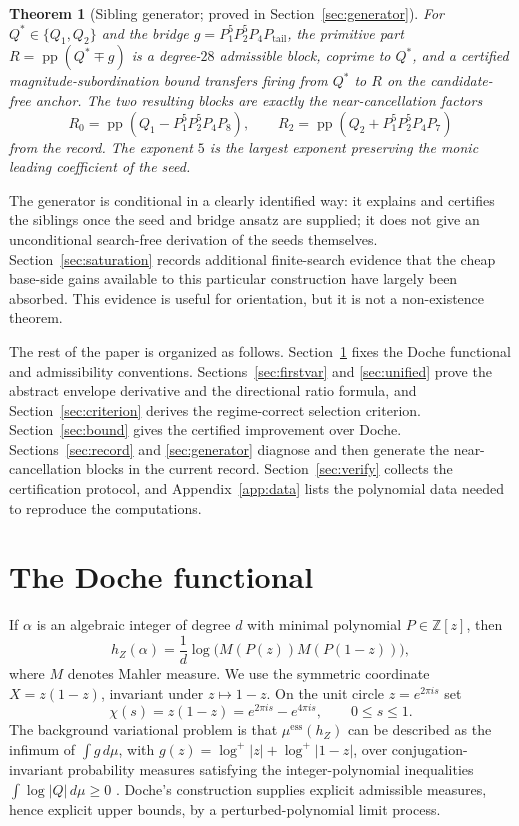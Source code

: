\documentclass[11pt,reqno]{amsart}
\theoremstyle{plain}
\newtheorem{theorem}{Theorem}
\theoremstyle{definition}
\theoremstyle{remark}
\newcommand{\Z}{\mathbb{Z}}
\newcommand{\hZ}{h_Z}
\newcommand{\essmin}{\mu^{\mathrm{ess}}(\hZ)}
\DeclareMathOperator{\pp}{pp}
\begin{document}
\begin{theorem}[Sibling generator; proved in Section~\ref{sec:generator}]
\label{thm:gen-intro}
For $Q^*\in\{Q_1,Q_2\}$ and the bridge $g=P_1^5P_2^5P_4P_{\mathrm{tail}}$, the
primitive part $R=\pp(Q^*\mp g)$ is a degree-$28$ admissible block, coprime to $Q^*$,
and a certified magnitude-subordination bound transfers firing from $Q^*$ to $R$ on
the candidate-free anchor.  The two resulting blocks are exactly the
near-cancellation factors
\[
  R_0=\pp(Q_1-P_1^5P_2^5P_4P_8),\qquad
  R_2=\pp(Q_2+P_1^5P_2^5P_4P_7)
\]
from the \citet{Gri26} record.  The exponent $5$ is the largest exponent preserving
the monic leading coefficient of the seed.
\end{theorem}

The generator is conditional in a clearly identified way: it explains and certifies the
siblings once the seed and bridge ansatz are supplied; it does not give an unconditional
search-free derivation of the seeds themselves.  Section~\ref{sec:saturation} records
additional finite-search evidence that the cheap base-side gains available to this
particular construction have largely been absorbed.  This evidence is useful for
orientation, but it is not a non-existence theorem.

The rest of the paper is organized as follows.  Section~\ref{sec:functional} fixes the
Doche functional and admissibility conventions.  Sections~\ref{sec:firstvar} and
\ref{sec:unified} prove the abstract envelope derivative and the directional ratio
formula, and Section~\ref{sec:criterion} derives the regime-correct selection
criterion.  Section~\ref{sec:bound} gives the certified improvement over Doche.
Sections~\ref{sec:record} and \ref{sec:generator} diagnose and then generate the
near-cancellation blocks in the current record.  Section~\ref{sec:verify} collects the
certification protocol, and Appendix~\ref{app:data} lists the polynomial data needed to
reproduce the computations.

\section{The Doche functional}\label{sec:functional}

If $\alpha$ is an algebraic integer of degree $d$ with minimal polynomial
$P\in\Z[z]$, then
\[
  \hZ(\alpha)=\frac1d\log\bigl(M(P(z))M(P(1-z))\bigr),
\]
where $M$ denotes Mahler measure.  We use the symmetric coordinate
$X=z(1-z)$, invariant under $z\mapsto1-z$.  On the unit circle $z=e^{2\pi i s}$ set
\[
  \chi(s)=z(1-z)=e^{2\pi i s}-e^{4\pi i s},\qquad 0\le s\le1.
\]
The background variational problem is that $\essmin$ can be described as the infimum
of $\int g\,d\mu$, with $g(z)=\log^+|z|+\log^+|1-z|$, over conjugation-invariant
probability measures satisfying the integer-polynomial inequalities
$\int\log|Q|\,d\mu\ge0$ \citep[Thm.~6.5]{BMQS}.  Doche's construction supplies explicit
admissible measures, hence explicit upper bounds, by a perturbed-polynomial limit
process.
\end{document}
